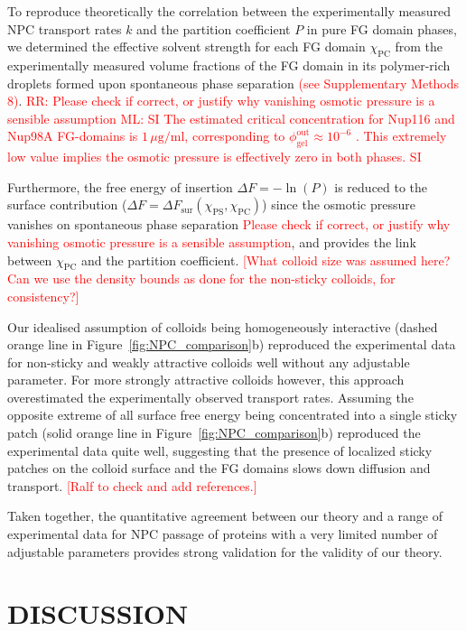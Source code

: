 \documentclass[12pt, a4paper]{article}
\newcommand\todo[1]{\textcolor{red}{#1}}
\begin{document}
To reproduce theoretically the correlation between the experimentally measured NPC transport rates $k$ and the partition coefficient $P$ in pure FG domain phases, we determined the effective solvent strength for each FG domain $\chi_\text{PC}$ from the experimentally measured volume fractions of the FG domain in its polymer-rich droplets formed upon spontaneous phase separation \cite{Frey2018} 
\todo{(see Supplementary Methods 8)}.
\todo{RR: Please check if correct, or justify why vanishing osmotic
pressure is a sensible assumption}
\todo{ML: SI The estimated critical concentration for Nup116 and Nup98A FG-domains is $1 \, \mu\text{g}/\text{ml}$, corresponding to \mbox{$\phi_{\text{gel}}^{\text{out}} \approx 10^{-6}$} \cite{Schmidt2015}.
This extremely low value implies the osmotic pressure is effectively zero in both phases. SI}

Furthermore, the free energy of insertion $\Delta F = -\ln(P)$ is reduced to the surface contribution ($\Delta F = \Delta F_\text{sur}\left(\chi_\text{PS},\chi_\text{PC}\right)$) since the osmotic pressure vanishes on spontaneous phase separation \todo{{Please check if correct, or justify why vanishing osmotic pressure is a sensible assumption}}, and provides the link between $\chi_\text{PC}$ and the partition coefficient. 
\todo{[What colloid size was assumed here? Can we use the density bounds as done for the non-sticky colloids, for consistency?]}

Our idealised assumption of colloids being homogeneously interactive (dashed orange line in Figure~\ref{fig:NPC_comparison}b) reproduced the experimental data for non-sticky and weakly attractive colloids well without any adjustable parameter.
For more strongly attractive colloids however, this approach overestimated the experimentally observed transport rates.
Assuming the opposite extreme of all surface free energy being concentrated into a single sticky patch (solid orange line in Figure~\ref{fig:NPC_comparison}b) reproduced the experimental data quite well, suggesting that the presence of localized sticky patches on the colloid surface and the FG domains slows down diffusion and transport.
\todo{[Ralf to check and add references.]}

Taken together, the quantitative agreement between our theory and a range of experimental data for NPC passage of proteins with a very limited number of adjustable parameters provides strong validation for the validity of our theory.


\section{DISCUSSION}
\end{document}

